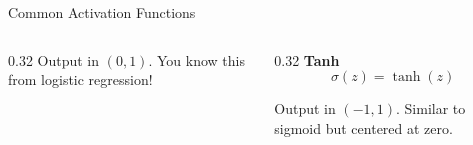 \begin{frame}{Common Activation Functions}
\begin{columns}[T]
\begin{column}{0.32\textwidth}
            \small
            Output in $(0, 1)$. You know this from logistic regression!
        \end{column}
        
        \begin{column}{0.32\textwidth}
            \centering
            \textbf{Tanh}
            \[
                \sigma(z) = \tanh(z)
            \]
            
            
            \small
            Output in $(-1, 1)$. Similar to sigmoid but centered at zero.
        \end{column}
    \end{columns}
\end{frame}

